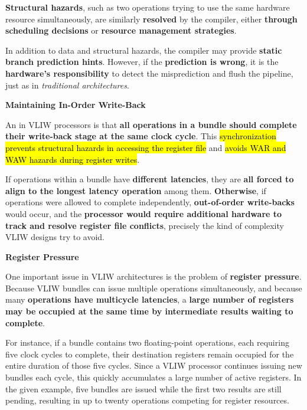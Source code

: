 \highspace
\textbf{Structural hazards}, such as two operations trying to use the same hardware resource simultaneously, are similarly \textbf{resolved} by the compiler, either \textbf{through scheduling decisions} or \textbf{resource management strategies}.

\newpage

\noindent
In addition to data and structural hazards, the compiler may provide \textbf{static branch prediction hints}. However, if the \textbf{prediction is wrong}, it is the \textbf{hardware's responsibility} to detect the misprediction and flush the pipeline, just as in \emph{traditional architectures}.

\highspace
\begin{flushleft}
    \textcolor{Green3}{ \textbf{Maintaining In-Order Write-Back}}
\end{flushleft}
An  in VLIW processors is that \textbf{all operations in a bundle should complete their write-back stage at the same clock cycle}. This \hl{synchronization prevents structural hazards in accessing the register file} and \hl{avoids WAR and WAW hazards during register writes}.

\highspace
If operations within a bundle have \textbf{different latencies}, they are \textbf{all forced to align to the longest latency operation} among them. \textbf{Otherwise}, if operations were allowed to complete independently, \textbf{out-of-order write-backs} would occur, and the \textbf{processor would require additional hardware to track and resolve register file conflicts}, precisely the kind of complexity VLIW designs try to avoid.

\highspace
\begin{flushleft}
    \textcolor{Red2}{ \textbf{Register Pressure}}
\end{flushleft}
One important issue in VLIW architectures is the problem of \textbf{register pressure}. Because VLIW bundles can issue multiple operations simultaneously, and because many \textbf{operations have multicycle latencies}, a \textbf{large number of registers may be occupied at the same time by intermediate results waiting to complete}.

\highspace
For instance, if a bundle contains two floating-point operations, each requiring five clock cycles to complete, their destination registers remain occupied for the entire duration of those five cycles. Since a VLIW processor continues issuing new bundles each cycle, this quickly accumulates a large number of active registers. In the given example, five bundles are issued while the first two results are still pending, resulting in up to twenty operations competing for register resources.

